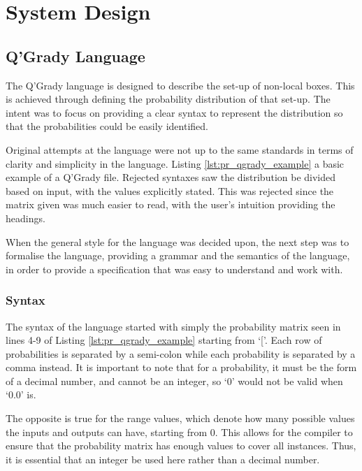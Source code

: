 \documentclass[report.tex]{subfiles}
\begin{document}
\chapter{System Design} %
\label{cha:system_design}
\section{Q'Grady Language} %
\label{sec:q_grady_language}
The Q'Grady language is designed to describe the set-up of non-local boxes.
This is achieved through defining the probability distribution of that set-up.
The intent was to focus on providing a clear syntax to represent the
distribution so that the probabilities could be easily identified. 

Original attempts at the language were not up to the same standards in terms of
clarity and simplicity in the language. Listing \ref{lst:pr_qgrady_example}
a basic example of a Q'Grady file. Rejected syntaxes saw the distribution
be divided based on input, with the values explicitly stated. This was rejected
since the matrix given was much easier to read, with the user's intuition
providing the headings.

 

When the general style for the language was decided upon, the next step was to
formalise the language, providing a grammar and the semantics of the language,
in order to provide a specification that was easy to understand and work with.

\subsection{Syntax} %
\label{sub:syntax}
The syntax of the language started with simply the probability matrix seen in
lines 4-9 of Listing \ref{lst:pr_qgrady_example} starting from `['. Each row of
probabilities is separated by a semi-colon while each probability is separated
by a comma instead. It is important to note that for a probability, it must be
the form of a decimal number, and cannot be an integer, so `0' would not be
valid when `0.0' is.

The opposite is true for the range values, which denote how many possible values
the inputs and outputs can have, starting from 0. This allows for the compiler
to ensure that the probability matrix has enough values to cover all instances.
Thus, it is essential that an integer be used here rather than a decimal number.
\end{document}
